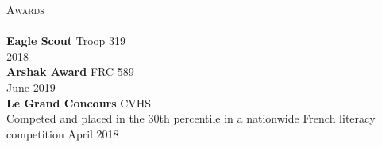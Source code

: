 \documentclass[a4paper]{article}
\newcommand{\lineunder} {
    \vspace*{-8pt} \\
    \hspace*{-18pt} \hrulefill \\
}
\newcommand{\header} [1] {
    {\hspace*{-18pt}\vspace*{6pt} \textsc{#1}}
    \vspace*{-6pt} \lineunder
}
\begin{document}
\header{Awards}
\textbf{Eagle Scout} \hfill Troop 319\\
\hfill 2018\\
\vspace*{2mm}
\textbf{Arshak Award} \hfill FRC 589\\
\hfill June 2019\\
\vspace*{2mm}
\textbf{Le Grand Concours} \hfill CVHS\\
Competed and placed in the 30th percentile in a nationwide French literacy competition \hfill April 2018\\
\vspace*{2mm}

\
\end{document}
